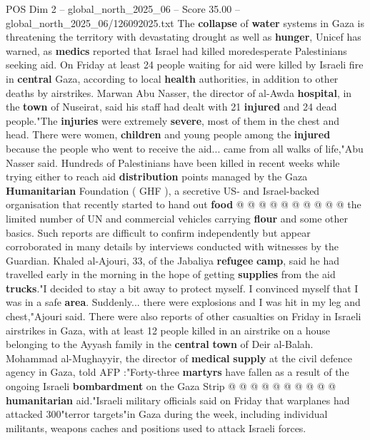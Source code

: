 \begin{textsample}{POS Dim 2 – global\_north\_2025\_06 – Score 35.00 – global\_north\_2025\_06/126092025.txt}  \label{ex:f2_pos_221}
The \textbf{collapse} of \textbf{water} systems in Gaza is threatening the territory with devastating drought as well as \textbf{hunger}, Unicef has warned, as \textbf{medics} reported that Israel had killed moredesperate Palestinians seeking aid.
On Friday at least 24 people waiting for aid were killed by Israeli fire in \textbf{central} Gaza, according to local \textbf{health} authorities, in addition to other deaths by airstrikes.
Marwan Abu Nasser, the director of al-Awda \textbf{hospital}, in the \textbf{town} of Nuseirat, said his staff had dealt with 21 \textbf{injured} and 24 dead people."The \textbf{injuries} were extremely \textbf{severe}, most of them in the chest and head.
There were women, \textbf{children} and young people among the \textbf{injured} because the people who went to receive the aid... came from all walks of life,"Abu Nasser said.
Hundreds of Palestinians have been killed in recent weeks while trying either to reach aid \textbf{distribution} points managed by the Gaza \textbf{Humanitarian} Foundation ( GHF ), a secretive US- and Israel-backed organisation that recently started to hand out \textbf{food} @ @ @ @ @ @ @ @ @ @ the limited number of UN and commercial vehicles carrying \textbf{flour} and some other basics.
Such reports are difficult to confirm independently but appear corroborated in many details by interviews conducted with witnesses by the Guardian.
Khaled al-Ajouri, 33, of the Jabaliya \textbf{refugee} \textbf{camp}, said he had travelled early in the morning in the hope of getting \textbf{supplies} from the aid \textbf{trucks}."I decided to stay a bit away to protect myself.
I convinced myself that I was in a safe \textbf{area}.
Suddenly... there were explosions and I was hit in my leg and chest,"Ajouri said.
There were also reports of other casualties on Friday in Israeli airstrikes in Gaza, with at least 12 people killed in an airstrike on a house belonging to the Ayyash family in the \textbf{central} \textbf{town} of Deir al-Balah.
Mohammad al-Mughayyir, the director of \textbf{medical} \textbf{supply} at the civil defence agency in Gaza, told AFP :"Forty-three \textbf{martyrs} have fallen as a result of the ongoing Israeli \textbf{bombardment} on the Gaza Strip @ @ @ @ @ @ @ @ @ @ \textbf{humanitarian} aid."Israeli military officials said on Friday that warplanes had attacked 300"terror targets"in Gaza during the week, including individual militants, weapons caches and positions used to attack Israeli forces.

\end{textsample}
